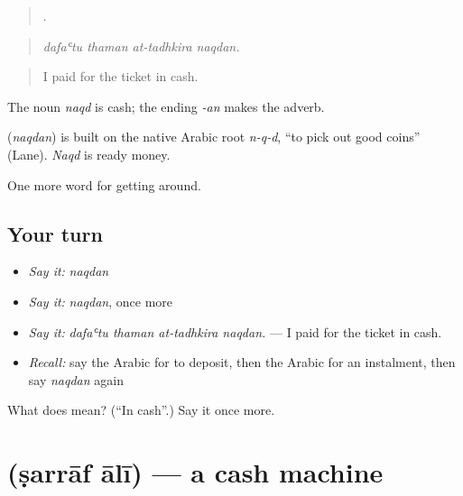 \begin{quote}
   .
\end{quote}

\begin{quote}
\emph{dafaʿtu thaman at-tadhkira naqdan.}
\end{quote}

\begin{quote}
I paid for the ticket in cash.
\end{quote}

The noun \emph{naqd} is cash; the ending \emph{-an} makes the adverb.

\begin{cousinweb}
\textbf{} (\emph{naqdan}) is built on the native Arabic root \emph{n-q-d}, \textquotedblleft{}to pick out good coins\textquotedblright{} (Lane). \emph{Naqd} is ready money.
\end{cousinweb}

\begin{grammarlens}[title={What you've built}]
One more word for getting around.
\end{grammarlens}

\subsection*{Your turn}
\begin{itemize}
\raggedright
  \item \emph{Say it:} \emph{naqdan}
  \item \emph{Say it:} \emph{naqdan}, once more
  \item \emph{Say it:} \emph{dafaʿtu thaman at-tadhkira naqdan.} — I paid for the ticket in cash.
  \item \emph{Recall:} say the Arabic for to deposit, then the Arabic for an instalment, then say \emph{naqdan} again
\end{itemize}

\begin{tcolorbox}[breakable,colback=teal!4,colframe=teal!35!black,title={Before you move on}]
What does  mean? (\textquotedblleft{}In cash\textquotedblright{}.) Say it once more.
\end{tcolorbox}
\section[\texorpdfstring{\ar{صراف} \ar{آلي} (ṣarrāf ālī)}{صراف آلي (ṣarrāf ālī)}]{  (ṣarrāf ālī) — a cash machine}

